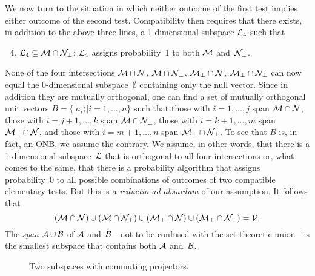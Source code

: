 \documentclass[12pt]{article}
\newcommand{\ket}[1]{\vert#1\rangle}
\newcommand{\be}{\begin{equation}}
\newcommand{\ee}{\end{equation}}
\newcommand{\ben}{\begin{enumerate}}
\newcommand{\een}{\end{enumerate}}
\newcommand{\cA}{{\cal A}}
\newcommand{\cB}{{\cal B}}
\newcommand{\cL}{{\cal L}}
\newcommand{\cM}{{\cal M}}
\newcommand{\cN}{{\cal N}}
\newcommand{\cV}{{\cal V}}
\begin{document}
We now turn to the situation in which neither outcome of the first test implies either outcome of the second test. Compatibility then requires that there exists, in addition to the above three lines, a 1-dimensional subspace $\cL_4$ such that
\ben
\setcounter{enumi}{3}
\item $\cL_4\subseteq\cM\cap\cN_\perp$: $\cL_4$ assigns probability~1 to both $\cM$ and~$\cN_\perp$.
\een
None of the four intersections $\cM\cap\cN$, $\cM\cap\cN_\perp$, $\cM_\perp\cap\cN$, $\cM_\perp\cap\cN_\perp$ can now equal the 0-dimensional subspace~$\emptyset$ containing only the null vector. Since in addition they are mutually orthogonal, one can find a set of mutually orthogonal unit vectors $B=\{\ket{a_i}|i=1,\dots,n\}$ such that those with $i=1,\dots,j$ span $\cM\cap\cN$, those with $i=j+1,\dots,k$ span $\cM\cap\cN_\perp$, those with $i=k+1,\dots,m$ span $\cM_\perp\cap\cN$, and those with $i=m+1,\dots,n$ span $\cM_\perp\cap\cN_\perp$. To see that $B$ is, in fact, an ONB, we assume the contrary. We assume, in other words, that there is a 1-dimensional subspace~$\cL$ that is orthogonal to all four intersections or, what comes to the same, that there is a probability algorithm that assigns probability~0 to all possible combinations of outcomes of two compatible elementary tests. But this is a \textit{reductio ad absurdum} of our assumption. It follows that
\be
(\cM\cap\cN)\cup(\cM\cap\cN_\perp)\cup(\cM_\perp\cap\cN)\cup(\cM_\perp\cap\cN_\perp)=\cV.
\label{EQMNcupcap}
\ee
The \textit{span} $\cA\cup\cB$ of $\cA$ and~$\cB$---not to be confused with the set-theoretic union---is the smallest subspace that contains both $\cA$ and~$\cB$.
\begin{figure}[t]
\begin{center}
\end{center}
\caption{Two subspaces with commuting projectors.}
\label{FIGcom}
\end{figure}
\end{document}
